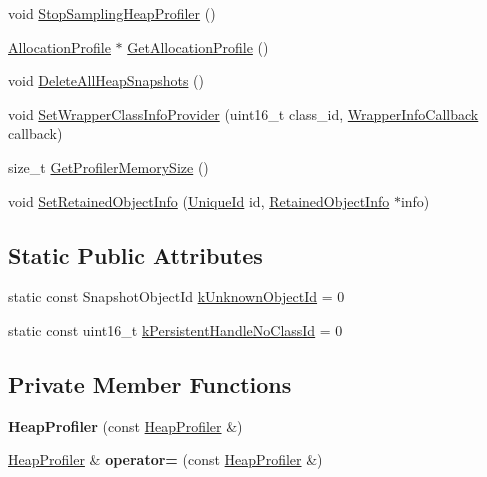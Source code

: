 \begin{DoxyCompactItemize}
\item 
void \hyperlink{classv8_1_1_heap_profiler_abc43e12e6febb087be251c0629ff17bf}{Stop\+Sampling\+Heap\+Profiler} ()
\item 
\hyperlink{classv8_1_1_allocation_profile}{Allocation\+Profile} $\ast$ \hyperlink{classv8_1_1_heap_profiler_a371a6e936782571f81542bfafce359d9}{Get\+Allocation\+Profile} ()
\item 
void \hyperlink{classv8_1_1_heap_profiler_a6a75bcc6d8350858597b6a6ce5e349a2}{Delete\+All\+Heap\+Snapshots} ()
\item 
void \hyperlink{classv8_1_1_heap_profiler_a7744cf111ad9c6b0b409841f8ed8bcdd}{Set\+Wrapper\+Class\+Info\+Provider} (uint16\+\_\+t class\+\_\+id, \hyperlink{classv8_1_1_heap_profiler_a677025dd201fd832e0464e5ab0b0d0d4}{Wrapper\+Info\+Callback} callback)
\item 
size\+\_\+t \hyperlink{classv8_1_1_heap_profiler_a76435e93466db7519fb31417ea39b13e}{Get\+Profiler\+Memory\+Size} ()
\item 
void \hyperlink{classv8_1_1_heap_profiler_a70821ff8e1c2cc92c310c5c4f1fa5ec7}{Set\+Retained\+Object\+Info} (\hyperlink{classv8_1_1_unique_id}{Unique\+Id} id, \hyperlink{classv8_1_1_retained_object_info}{Retained\+Object\+Info} $\ast$info)
\end{DoxyCompactItemize}
\subsection*{Static Public Attributes}
\begin{DoxyCompactItemize}
\item 
static const Snapshot\+Object\+Id \hyperlink{classv8_1_1_heap_profiler_a40f41d75716ff1b335e95521296e027d}{k\+Unknown\+Object\+Id} = 0
\item 
static const uint16\+\_\+t \hyperlink{classv8_1_1_heap_profiler_a272c9af3ea5cd90a2737af3d22a7eb78}{k\+Persistent\+Handle\+No\+Class\+Id} = 0
\end{DoxyCompactItemize}
\subsection*{Private Member Functions}
\begin{DoxyCompactItemize}
\item 
{\bfseries Heap\+Profiler} (const \hyperlink{classv8_1_1_heap_profiler}{Heap\+Profiler} \&)\hypertarget{classv8_1_1_heap_profiler_abb7dd8b5c784388e6ca2266344f18056}{}\label{classv8_1_1_heap_profiler_abb7dd8b5c784388e6ca2266344f18056}

\item 
\hyperlink{classv8_1_1_heap_profiler}{Heap\+Profiler} \& {\bfseries operator=} (const \hyperlink{classv8_1_1_heap_profiler}{Heap\+Profiler} \&)\hypertarget{classv8_1_1_heap_profiler_a9792e8ddde522f8e2aa97005c0e6bc8f}{}\label{classv8_1_1_heap_profiler_a9792e8ddde522f8e2aa97005c0e6bc8f}

\end{DoxyCompactItemize}


